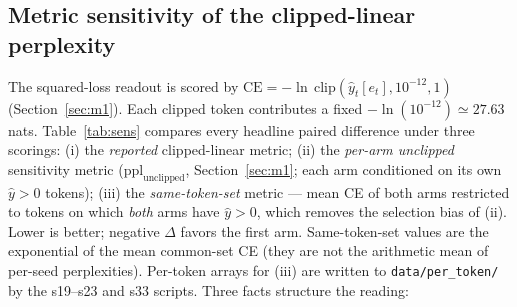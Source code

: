 \documentclass[preprint,12pt]{elsarticle}
\begin{document}
\subsection{Metric sensitivity of the clipped-linear perplexity}
\label{sec:sens}

The squared-loss readout is scored by
$\mathrm{CE}=-\ln\,\mathrm{clip}(\hat y_t[e_t],10^{-12},1)$
(Section~\ref{sec:m1}). Each clipped token contributes a fixed
$-\ln(10^{-12})\simeq27.63$ nats. Table~\ref{tab:sens} compares every
headline paired difference under three scorings:
(i) the \emph{reported} clipped-linear metric;
(ii) the \emph{per-arm unclipped} sensitivity metric
($\mathrm{ppl}_{\mathrm{unclipped}}$, Section~\ref{sec:m1}; each arm
conditioned on its own $\hat y>0$ tokens);
(iii) the \emph{same-token-set} metric --- mean CE of both arms
restricted to tokens on which \emph{both} arms have $\hat y>0$, which
removes the selection bias of (ii).
Lower is better; negative $\Delta$ favors the first arm.
Same-token-set values are the exponential of the mean common-set CE
(they are not the arithmetic mean of per-seed perplexities).
Per-token arrays for (iii) are written to
\texttt{data/per\_token/} by the s19--s23 and s33 scripts.
Three facts structure the reading:
\end{document}
